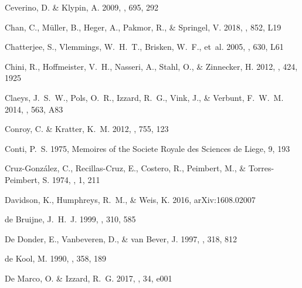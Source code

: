 \documentclass{aa}
\begin{document}
\begin{thebibliography}{242}
{Ceverino}, D. \& {Klypin}, A. 2009, \apj, 695, 292

{Chan}, C., {M{\"u}ller}, B., {Heger}, A., {Pakmor}, R., \& {Springel}, V.
  2018, \apjl, 852, L19

{Chatterjee}, S., {Vlemmings}, W.~H.~T., {Brisken}, W.~F., {et~al.} 2005,
  \apjl, 630, L61

{Chini}, R., {Hoffmeister}, V.~H., {Nasseri}, A., {Stahl}, O., \& {Zinnecker},
  H. 2012, \mnras, 424, 1925

{Claeys}, J.~S.~W., {Pols}, O.~R., {Izzard}, R.~G., {Vink}, J., \& {Verbunt},
  F.~W.~M. 2014, \aap, 563, A83

{Conroy}, C. \& {Kratter}, K.~M. 2012, \apj, 755, 123

{Conti}, P.~S. 1975, Memoires of the Societe Royale des Sciences de Liege, 9,
  193

{Cruz-Gonz{\'a}lez}, C., {Recillas-Cruz}, E., {Costero}, R., {Peimbert}, M., \&
  {Torres-Peimbert}, S. 1974, \rmxaa, 1, 211

{Davidson}, K., {Humphreys}, R.~M., \& {Weis}, K. 2016, arXiv:1608.02007

{de Bruijne}, J.~H.~J. 1999, \mnras, 310, 585

{De Donder}, E., {Vanbeveren}, D., \& {van Bever}, J. 1997, \aap, 318, 812

{de Kool}, M. 1990, \apj, 358, 189

{De Marco}, O. \& {Izzard}, R.~G. 2017, \pasa, 34, e001


\end{thebibliography}
\end{document}
